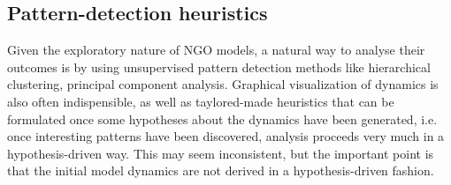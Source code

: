 \subsection{Pattern-detection heuristics}

Given the exploratory nature of NGO models, a natural way to analyse their outcomes is by using unsupervised pattern detection methods like hierarchical clustering, principal component analysis. Graphical visualization of dynamics is also often indispensible, as well as taylored-made heuristics that can be formulated once some hypotheses about the dynamics have been generated, i.e. once interesting patterns have been discovered, analysis proceeds very much in a hypothesis-driven way. This may seem inconsistent, but the important point is that the initial model dynamics are not derived in a hypothesis-driven fashion. 
  